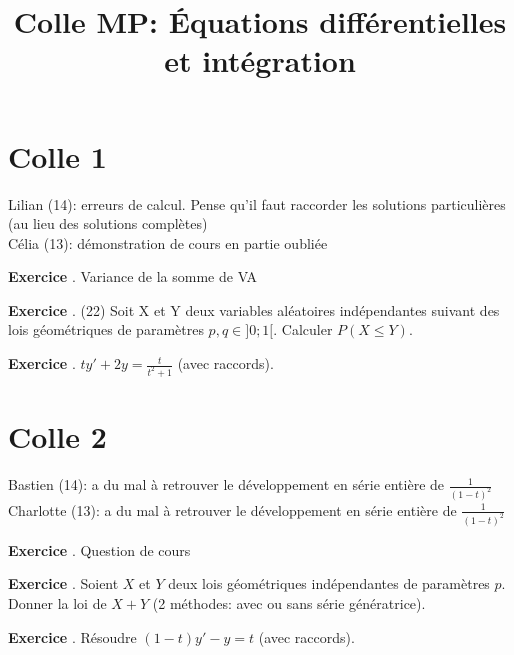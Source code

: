 \documentclass[10pt,a4paper]{article}
\title{Colle MP: Équations différentielles et intégration}
\newcounter{question}
\newcounter{exo}
\newenvironment{exo}{\vspace{0.5cm}\setcounter{question}{0}\addtocounter{exo}{1} \noindent \textbf{Exercice \theexo}. \normalsize }{\par}
\begin{document}
	\maketitle
	
	\section*{Colle 1}	
	Lilian (14): erreurs de calcul. Pense qu'il faut raccorder les solutions particulières (au lieu des solutions complètes)\\
	Célia (13): démonstration de cours en partie oubliée\\

	\begin{exo}
		Variance de la somme de VA
	\end{exo}

	\begin{exo} (22)
		Soit X et Y deux variables aléatoires indépendantes suivant des lois géométriques de paramètres $p, q \in ]0 ; 1[$.
		Calculer $P(X \leq Y)$.
	\end{exo}
	
	\begin{exo}
		$ty' + 2y = \frac{t}{t^2+1}$ (avec raccords).
	\end{exo}
			
	\section*{Colle 2}
	\setcounter{exo}{0}
	Bastien (14): a du mal à retrouver le développement en série entière de $\frac{1}{(1-t)^2}$\\
	Charlotte (13): a du mal à retrouver le développement en série entière de $\frac{1}{(1-t)^2}$\\

	\begin{exo}
		Question de cours
	\end{exo}

	\begin{exo}
		Soient $X$ et $Y$ deux lois géométriques indépendantes de paramètres $p$.\\
		Donner la loi de $X + Y$ (2 méthodes: avec ou sans série génératrice).
	\end{exo}
	
	\begin{exo}
		Résoudre $(1 - t)y' - y = t$ (avec raccords).
	\end{exo}
	\newpage
\end{document}
